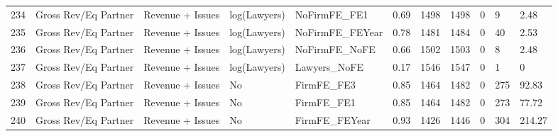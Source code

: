 \begin{table}[ht]
\begin{tabular}{rllllllllll}
  234 & Gross Rev/Eq Partner & Revenue + Issues & log(Lawyers) & NoFirmFE\_FE1 & 0.69 & 1498 & 1498 & 0 & 9 & 2.48 \\ 
  235 & Gross Rev/Eq Partner & Revenue + Issues & log(Lawyers) & NoFirmFE\_FEYear & 0.78 & 1481 & 1484 & 0 & 40 & 2.53 \\ 
  236 & Gross Rev/Eq Partner & Revenue + Issues & log(Lawyers) & NoFirmFE\_NoFE & 0.66 & 1502 & 1503 & 0 & 8 & 2.48 \\ 
  237 & Gross Rev/Eq Partner & Revenue + Issues & log(Lawyers) & Lawyers\_NoFE & 0.17 & 1546 & 1547 & 0 & 1 & 0 \\ 
  238 & Gross Rev/Eq Partner & Revenue + Issues & No & FirmFE\_FE3 & 0.85 & 1464 & 1482 & 0 & 275 & 92.83 \\ 
  239 & Gross Rev/Eq Partner & Revenue + Issues & No & FirmFE\_FE1 & 0.85 & 1464 & 1482 & 0 & 273 & 77.72 \\ 
  240 & Gross Rev/Eq Partner & Revenue + Issues & No & FirmFE\_FEYear & 0.93 & 1426 & 1446 & 0 & 304 & 214.27 \\ 
   \hline
\end{tabular}
\end{table}
